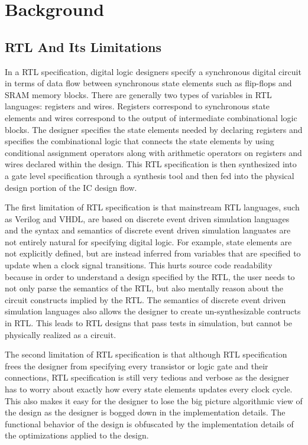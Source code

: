 \section{Background}
\subsection{RTL And Its Limitations}
\label{section:RTLCons}
In a RTL specification, digital logic designers specify a synchronous digital circuit in terms of data flow between synchronous state elements such as flip-flops and SRAM memory blocks. There are generally two types of variables in RTL languages: registers and wires. Registers correspond to synchronous state elements and wires correspond to the output of intermediate combinational logic blocks. The designer specifies the state elements needed by declaring registers and specifies the combinational logic that connects the state elements by using conditional assignment operators along with arithmetic operators on registers and wires declared within the design. This RTL specification is then synthesized into a gate level specification through a synthesis tool and then fed into the physical design portion of the IC design flow. 

The first limitation of RTL specification is that mainstream RTL languages, such as Verilog and VHDL, are based on discrete event driven simulation languages and the syntax and semantics of discrete event driven simulation languates are not entirely natural for specifying digital logic. For example, state elements are not explicitly defined, but are instead inferred from variables that are specified to update when a clock signal transitions. This hurts source code readability because in order to understand a design specified by the RTL, the user needs to not only parse the semantics of the RTL, but also mentally reason about the circuit constructs implied by the RTL. The semantics of discrete event driven simulation languages also allows the designer to create un-synthesizable contructs in RTL. This leads to RTL designs that pass tests in simulation, but cannot be physically realized as a circuit.

The second limitation of RTL specification is that although RTL specification frees the designer from specifying every transistor or logic gate and their connections, RTL specification is still very tedious and verbose as the designer has to worry about exactly how every state elements updates every clock cycle. This also makes it easy for the designer to lose the big picture algorithmic view of the design as the designer is bogged down in the implementation details. The functional behavior of the design is obfuscated by the implementation details of the optimizations applied to the design.

